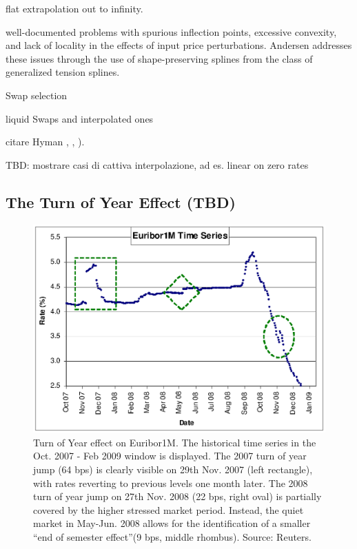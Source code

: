 \documentclass[11pt,reqno]{amsart}
\begin{document}
flat extrapolation out to infinity.

well-documented problems with spurious inflection points, excessive convexity, and lack of locality in the effects of input price perturbations. Andersen \cite{And07} addresses these issues through the use of shape-preserving splines from the class of generalized tension splines.

Swap selection

liquid Swaps and interpolated ones

citare Hyman \cite{Hym1983}, \cite{HagWes06}, \cite{HagWes08}).

TBD: mostrare casi di cattiva interpolazione, ad es. linear on zero rates

\subsection{\label{sec:TOY}The Turn of Year Effect (TBD)}
\begin{figure}[tbp]
\centering
\includegraphics[scale=1.0]{../figures/FigEuribor1M}
\caption{Turn of Year effect on Euribor1M. The historical time series in the Oct. 2007 - Feb 2009 window is displayed. The 2007 turn of year jump (64 bps) is clearly visible on 29th Nov. 2007 (left rectangle), with rates reverting to previous levels one month later. The 2008 turn of year jump on 27th Nov. 2008 (22 bps, right oval) is partially covered by the higher stressed market period. Instead, the quiet market in May-Jun. 2008 allows for the identification of a smaller \textquotedblleft end of semester effect\textquotedblright (9 bps, middle rhombus). Source: Reuters.}
\label{fig:ToY}
\end{figure}
\end{document}
